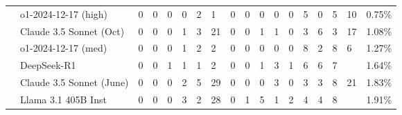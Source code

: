 \begin{table*}[t]
\begin{tabular}{l|p{0.45cm}p{0.45cm}p{0.45cm}p{0.45cm}p{0.45cm}p{0.45cm}|p{0.45cm}p{0.45cm}p{0.45cm}|l|p{0.45cm}p{0.45cm}p{0.45cm}|l|p{0.45cm}|c}
\ \ o1-2024-12-17 (high) & \cellcolor{ReliableGreen}0 & \cellcolor{ReliableGreen}0 & \cellcolor{ReliableGreen}0 & \cellcolor{ReliableGreen}0 & \cellcolor{ReliableYellow}2 & \cellcolor{ReliableYellow}1 & \cellcolor{ReliableGreen}0 & \cellcolor{ReliableGreen}0 & \cellcolor{ReliableGreen}0 & \cellcolor{ReliableGreen}0 & \cellcolor{ReliableGreen}0 & \cellcolor{ReliableOrange}5 & \cellcolor{ReliableGreen}0 & \cellcolor{ReliableOrange}5 & \cellcolor{ReliableOrange}10 & \cellcolor{ReliableGray}0.75\% \\
\ \ Claude 3.5 Sonnet (Oct) & \cellcolor{ReliableGreen}0 & \cellcolor{ReliableGreen}0 & \cellcolor{ReliableGreen}0 & \cellcolor{ReliableYellow}1 & \cellcolor{ReliableYellow}3 & 21 & \cellcolor{ReliableGreen}0 & \cellcolor{ReliableGreen}0 & \cellcolor{ReliableYellow}1 & \cellcolor{ReliableYellow}1 & \cellcolor{ReliableGreen}0 & \cellcolor{ReliableYellow}3 & \cellcolor{ReliableOrange}6 & \cellcolor{ReliableYellow}3 & 17 & \cellcolor{ReliableGray}1.08\% \\
\ \ o1-2024-12-17 (med) & \cellcolor{ReliableGreen}0 & \cellcolor{ReliableGreen}0 & \cellcolor{ReliableGreen}0 & \cellcolor{ReliableYellow}1 & \cellcolor{ReliableYellow}2 & \cellcolor{ReliableYellow}2 & \cellcolor{ReliableGreen}0 & \cellcolor{ReliableGreen}0 & \cellcolor{ReliableGreen}0 & \cellcolor{ReliableGreen}0 & \cellcolor{ReliableGreen}0 & \cellcolor{ReliableOrange}8 & \cellcolor{ReliableYellow}2 & \cellcolor{ReliableOrange}8 & \cellcolor{ReliableOrange}6 & \cellcolor{ReliableGray}1.27\% \\
\ \ DeepSeek-R1 & \cellcolor{ReliableGreen}0 & \cellcolor{ReliableGreen}0 & \cellcolor{ReliableYellow}1 & \cellcolor{ReliableYellow}1 & \cellcolor{ReliableYellow}1 & \cellcolor{ReliableYellow}2 & \cellcolor{ReliableGreen}0 & \cellcolor{ReliableGreen}0 & \cellcolor{ReliableYellow}1 & \cellcolor{ReliableYellow}3 & \cellcolor{ReliableYellow}1 & \cellcolor{ReliableOrange}6 & \cellcolor{ReliableOrange}6 & \cellcolor{ReliableOrange}7 &  & \cellcolor{ReliableGray}1.64\% \\
\ \ Claude 3.5 Sonnet (June) & \cellcolor{ReliableGreen}0 & \cellcolor{ReliableGreen}0 & \cellcolor{ReliableGreen}0 & \cellcolor{ReliableYellow}2 & \cellcolor{ReliableYellow}5 & 29 & \cellcolor{ReliableGreen}0 & \cellcolor{ReliableGreen}0 & \cellcolor{ReliableGreen}0 & \cellcolor{ReliableYellow}3 & \cellcolor{ReliableGreen}0 & \cellcolor{ReliableYellow}3 & \cellcolor{ReliableYellow}3 & \cellcolor{ReliableOrange}8 & 21 & \cellcolor{ReliableGray}1.83\% \\
\ \ Llama 3.1 405B Inst & \cellcolor{ReliableGreen}0 & \cellcolor{ReliableGreen}0 & \cellcolor{ReliableGreen}0 & \cellcolor{ReliableYellow}3 & \cellcolor{ReliableYellow}2 & 28 & \cellcolor{ReliableGreen}0 & \cellcolor{ReliableYellow}1 & \cellcolor{ReliableOrange}5 & \cellcolor{ReliableYellow}1 & \cellcolor{ReliableYellow}2 & \cellcolor{ReliableOrange}4 & \cellcolor{ReliableYellow}4 & \cellcolor{ReliableOrange}8 &  & \cellcolor{ReliableGray}1.91\% \\

\end{tabular}
\end{table*}

